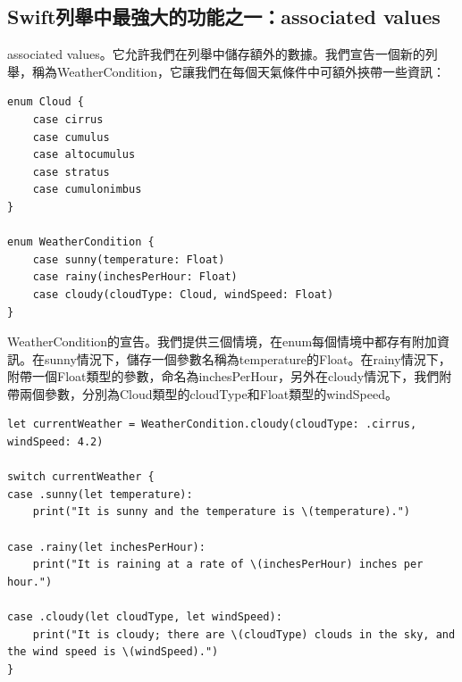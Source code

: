 \documentclass[a4paper,12pt]{article}
\begin{document}
\subsection{Swift列舉中最強大的功能之一：associated values}
\label{sec:orgd7a9fb4}
associated values。它允許我們在列舉中儲存額外的數據。我們宣告一個新的列舉，稱為WeatherCondition，它讓我們在每個天氣條件中可額外挾帶一些資訊：\\
\lstset{breaklines=true,language=swift,label= ,caption= ,captionpos=b,firstnumber=1,numbers=left}
\begin{lstlisting}
enum Cloud {
    case cirrus
    case cumulus
    case altocumulus
    case stratus
    case cumulonimbus
}

enum WeatherCondition {
    case sunny(temperature: Float)
    case rainy(inchesPerHour: Float)
    case cloudy(cloudType: Cloud, windSpeed: Float)
}
\end{lstlisting}
WeatherCondition的宣告。我們提供三個情境，在enum每個情境中都存有附加資訊。在sunny情況下，儲存一個參數名稱為temperature的Float。在rainy情況下，附帶一個Float類型的參數，命名為inchesPerHour，另外在cloudy情況下，我們附帶兩個參數，分別為Cloud類型的cloudType和Float類型的windSpeed。\\
\lstset{breaklines=true,language=swift,label= ,caption= ,captionpos=b,firstnumber=1,numbers=left}
\begin{lstlisting}
let currentWeather = WeatherCondition.cloudy(cloudType: .cirrus, windSpeed: 4.2)

switch currentWeather {
case .sunny(let temperature):
    print("It is sunny and the temperature is \(temperature).")

case .rainy(let inchesPerHour):
    print("It is raining at a rate of \(inchesPerHour) inches per hour.")

case .cloudy(let cloudType, let windSpeed):
    print("It is cloudy; there are \(cloudType) clouds in the sky, and the wind speed is \(windSpeed).")
}
\end{lstlisting}
\end{document}
